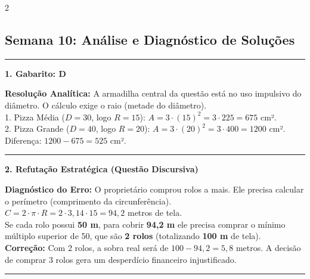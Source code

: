 \documentclass[11pt, a4paper]{article}
\begin{document}
\raggedcolumns
\begin{multicols*}{2}

\vspace{0.5cm}
\subsection*{Semana 10: Análise e Diagnóstico de Soluções}
\vspace{-0.2cm}\noindent\rule{\linewidth}{1.2pt} 
\vspace{0.2cm}

\textbf{1. Gabarito: \textcolor{CorGabarito}{D}}
\begin{boxresponda}
\textbf{Resolução Analítica:} A armadilha central da questão está no uso impulsivo do diâmetro. O cálculo exige o raio (metade do diâmetro).
\\[0.1cm]
1. Pizza Média ($D = 30$, logo $R = 15$): $A = 3 \cdot (15)^2 = 3 \cdot 225 = 675$ cm².
\\[0.1cm]
2. Pizza Grande ($D = 40$, logo $R = 20$): $A = 3 \cdot (20)^2 = 3 \cdot 400 = 1200$ cm².
\\[0.1cm]
Diferença: $1200 - 675 = 525$ cm².
\end{boxresponda}

\vspace{0.4cm}
\noindent\textcolor{CorLinha}{\rule{\linewidth}{0.5pt}} 
\vspace{0.2cm}

\textbf{2. Refutação Estratégica (Questão Discursiva)}
\begin{boxresponda}
\textbf{Diagnóstico do Erro:} O proprietário comprou rolos a mais. Ele precisa calcular o perímetro (comprimento da circunferência).
\\[0.1cm]
$C = 2 \cdot \pi \cdot R = 2 \cdot 3,14 \cdot 15 = 94,2$ metros de tela.
\\[0.1cm]
Se cada rolo possui \textbf{50 m}, para cobrir \textbf{94,2 m} ele precisa comprar o mínimo múltiplo superior de 50, que são \textbf{2 rolos} (totalizando \textbf{100 m} de tela).
\\[0.1cm]
\textbf{Correção:} Com 2 rolos, a sobra real será de $100 - 94,2 = 5,8$ metros. A decisão de comprar 3 rolos gera um desperdício financeiro injustificado.
\end{boxresponda}

\vspace{0.4cm}
\noindent\textcolor{CorLinha}{\rule{\linewidth}{0.5pt}} 
\vspace{0.2cm}


\end{multicols*}
\end{document}
